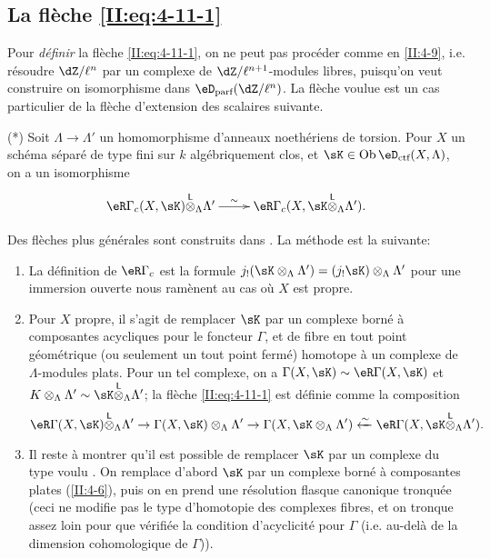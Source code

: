 \subsection{La flèche \texorpdfstring{\eqref{II:eq:4-11-1}}{(4.11.1)}}\label{II:4-12}

Pour \emph{définir} la flèche \eqref{II:eq:4-11-1}, on ne peut pas 
procéder comme en \ref{II:4-9}, i.e. résoudre $\dZ/\ell^n$ par un complexe 
de $\dZ/\ell^{n+1}$-modules libres, puisqu'on veut construire on isomorphisme 
dans $\eD_\text{parf}(\dZ/\ell^n)$. La flèche voulue est un cas particulier de 
la flèche d'extension des scalaires suivante. 

(*) Soit $\Lambda\to\Lambda'$ un homomorphisme d'anneaux noethériens de 
torsion. Pour $X$ un schéma séparé de type fini sur $k$ algébriquement 
clos, et $\sK\in\ob\eD_\text{ctf}(X,\Lambda)$, on a un isomorphisme 
\[\xymatrix{
  \eR\Gamma_c(X,\sK)\lotimes_\Lambda \Lambda' \ar[r]^-\sim & \eR \Gamma_c(X,\sK\lotimes_\Lambda \Lambda') \text{.}
}\]

Des flèches plus générales sont construits dans \cite[XVII 4.2.12]{sga4}. La 
m\'
ethode est la suivante: 
\begin{enumerate}[\indent a)]
  \item La définition de $\eR\Gamma_c$ est la formule 
    $j_!(\sK\otimes_\Lambda\Lambda') = (j_! \sK)\otimes_\Lambda\Lambda'$ pour une 
    immersion ouverte nous ramènent au cas où $X$ est propre. 
  \item Pour $X$ propre, il s'agit de remplacer $\sK$ par un complexe borné à 
    composantes acycliques pour le foncteur $\Gamma$, et de fibre en tout point 
    géométrique (ou seulement un tout point fermé) homotope à un 
    complexe de $\Lambda$-modules plats. Pour un tel complexe, on a 
    $\Gamma(X,\sK)\sim \eR\Gamma(X,\sK)$ et 
    $K\otimes_\Lambda\Lambda'\sim \sK\lotimes_\Lambda\Lambda'$; la flèche 
    \eqref{II:eq:4-11-1} est définie comme la composition 
    \[
      \eR\Gamma(X,\sK)\lotimes_\Lambda \Lambda' \to \Gamma(X,\sK)\otimes_\Lambda\Lambda' \to \Gamma(X,\sK\otimes_\Lambda\Lambda') \xleftarrow\sim \eR\Gamma(X,\sK\lotimes_\Lambda\Lambda') \text{.}
    \]
  \item Il reste à montrer qu'il est possible de remplacer $\sK$ par un 
    complexe du type voulu \cite[XVII.4.2.10]{sga4}. On remplace d'abord $\sK$ par 
    un complexe borné à composantes plates (\ref{II:4-6}), puis on en prend 
    une résolution flasque canonique tronquée (ceci ne modifie pas le type 
    d'homotopie des complexes fibres, et on tronque assez loin pour que 
    vérifiée la condition d'acyclicité pour $\Gamma$ (i.e. au-delà 
    de la dimension cohomologique de $\Gamma$)). 
\end{enumerate}





